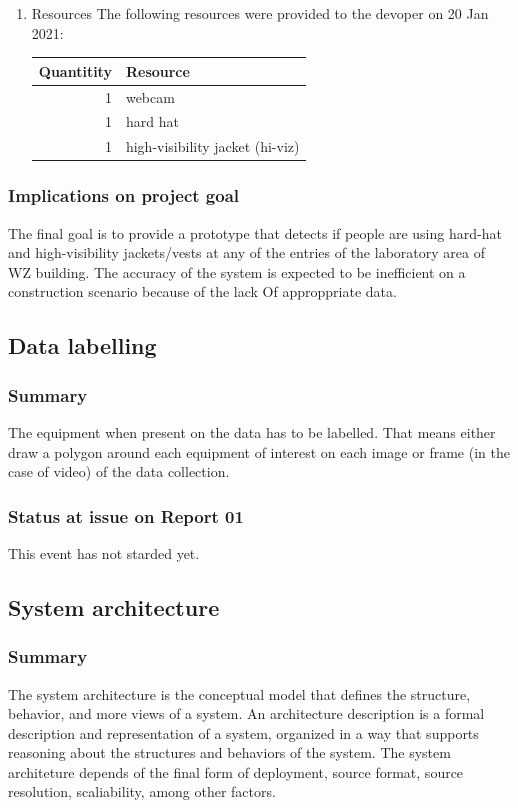 \documentclass{article}
\begin{document}
\begin{enumerate}
\item Resources
\label{sec:orgf185dad}
The following resources were provided to the devoper on 20 Jan 2021:

\begin{center}
\begin{tabular}{rl}
Quantitity & Resource\\
\hline
1 & webcam\\
1 & hard hat\\
1 & high-visibility jacket (hi-viz)\\
\end{tabular}
\end{center}
\end{enumerate}

\subsubsection{Implications on project goal}
\label{sec:org494e3d7}
The final goal is to provide a prototype that detects if people are using hard-hat and high-visibility jackets/vests at any of the entries of the laboratory area of WZ building.
The accuracy of the system is expected to be inefficient on a construction scenario because of the lack Of approppriate data.


\subsection{Data labelling}
\label{sec:orgd9d4d5e}
\subsubsection{Summary}
\label{sec:orgd86327c}
The equipment when present on the data has to be labelled.
That means either draw a polygon around each equipment of interest on each image or frame (in the case of video) of the data collection.
\subsubsection{Status at issue on Report 01}
\label{sec:orgfc36cc2}
This event has not starded yet.
\subsection{System architecture}
\label{sec:orgee15830}
\subsubsection{Summary}
\label{sec:org05cdbb4}
The system architecture is the conceptual model that defines the structure, behavior, and more views of a system.
An architecture description is a formal description and representation of a system, organized in a way that supports reasoning about the structures and behaviors of the system.
The system architeture depends of the final form of deployment, source format, source resolution, scaliability, among other factors.
\end{document}
